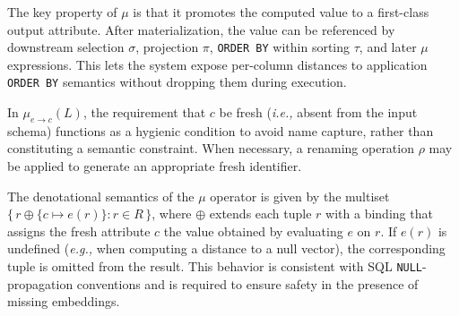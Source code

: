 \documentclass[sigconf]{acmart}
\theoremstyle{plain}
\theoremstyle{definition}
\newcommand{\ie}{\emph{i.e.,}\xspace}
\newcommand{\eg}{\emph{e.g.,}\xspace}
\theoremstyle{remark}
\begin{document}
The key property of \(\mu\) is that it promotes the computed value to a first-class output attribute. After materialization, the value can be referenced by downstream selection \(\sigma\), projection \(\pi\), \texttt{ORDER BY} within sorting \(\tau\), and later \(\mu\) expressions. This lets the system expose per-column distances to application \texttt{ORDER BY} semantics without dropping them during execution.

In \(\mu_{e\to c}(L)\), the requirement that \(c\) be fresh (\ie absent from the input schema) functions as a hygienic condition to avoid name capture, rather than constituting a semantic constraint. When necessary, a renaming operation \(\rho\) may be applied to generate an appropriate fresh identifier.

The denotational semantics of the \(\mu\) operator is given by the multiset \(\{\, r \oplus \{c \mapsto e(r)\} : r \in R \,\}\), where \(\oplus\) extends each tuple \(r\) with a binding that assigns the fresh attribute \(c\) the value obtained by evaluating \(e\) on \(r\). If \(e(r)\) is undefined (\eg when computing a distance to a null vector), the corresponding tuple is omitted from the result. This behavior is consistent with SQL \texttt{NULL}-propagation conventions and is required to ensure safety in the presence of missing embeddings.
\end{document}
